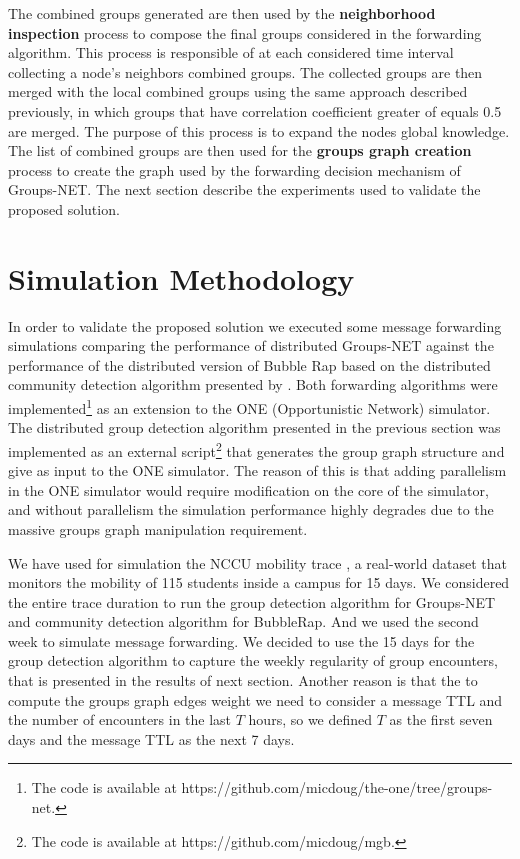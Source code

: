 The combined groups generated are then used by the \textbf{neighborhood inspection} process to compose the final groups considered in the forwarding algorithm. This process is responsible of at each considered time interval collecting a node's neighbors combined groups. The collected groups are then merged with the local combined groups using the same approach described previously, in which groups that have correlation coefficient greater of equals 0.5 are merged. The purpose of this process is to expand the nodes global knowledge. The list of combined groups are then used for the \textbf{groups graph creation} process to create the graph used by the forwarding decision mechanism of Groups-NET. The next section describe the experiments used to validate the proposed solution.

\section{Simulation Methodology}
\label{sec:GNExperiments}

In order to validate the proposed solution we executed some message forwarding simulations comparing the performance of distributed Groups-NET against the performance of the distributed version of Bubble Rap \citep{hui2011bubble} based on the distributed community detection algorithm presented by \citet{hui2007distributed}. Both forwarding algorithms were implemented\footnote{The code is available at https://github.com/micdoug/the-one/tree/groups-net.} as an extension to the ONE (Opportunistic Network) simulator. The distributed group detection algorithm presented in the previous section was implemented as an external script\footnote{The code is available at https://github.com/micdoug/mgb.} that generates the group graph structure and give as input to the ONE simulator. The reason of this is that adding parallelism in the ONE simulator would require modification on the core of the simulator, and without parallelism the simulation performance highly degrades due to the massive groups graph manipulation requirement.

We have used for simulation the NCCU mobility trace \citep{tsai2015nccu}, a real-world dataset that monitors the mobility of 115 students inside a campus for 15 days. We considered the entire trace duration to run the group detection algorithm for Groups-NET and community detection algorithm for BubbleRap. And we used the second week to simulate message forwarding. We decided to use the 15 days for the group detection algorithm to capture the weekly regularity of group encounters, that is presented in the results of next section. Another reason is that the to compute the groups graph edges weight we need to consider a message TTL and the number of encounters in the last $T$ hours, so we defined $T$ as the first seven days and the message TTL as the next 7 days.


